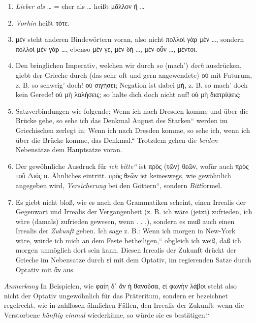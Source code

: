 \begin{enumerate}[leftmargin=0pt,rightmargin=0pt,listparindent =1cm,labelindent=1cm,labelsep=1ex,labelwidth={*},itemindent={*},align=left]
{μάρκας ἔχω παρὰ τοῦ πατρός.}
\item \emph{Lieber als} \ldots{} = eher als \ldots{} heißt \textgreek[variant=ancient]{μᾶλλον
ἢ }\ldots{}
\item \emph{Vorhin} heißt \textgreek[variant=ancient]{τότε.} 
\item \textgreek[variant=ancient]{μέν} steht anderen Bindewörtern voran,
also nicht \textgreek[variant=ancient]{πολλοὶ γὰρ μὲν }\ldots{}\textgreek[variant=ancient]{,}
sondern \textgreek[variant=ancient]{πολλοὶ μὲν γὰρ }\ldots{}\textgreek[variant=ancient]{,}
ebenso \textgreek[variant=ancient]{μέν γε, μὲν δή }\ldots{}\textgreek[variant=ancient]{,
μὲν οὖν }\ldots{}\textgreek[variant=ancient]{, μέντοι.}
\item Den bringlichen Imperativ, welchen wir durch \emph{so} (mach') \emph{doch}
ausdrücken, giebt der Grieche durch (das sehr oft und gern angewendete)
\textgreek[variant=ancient]{οὐ} mit Futurum, z. B. so schweig' doch!
\textgreek[variant=ancient]{οὐ σιγήσει;} Negation ist dabei \textgreek[variant=ancient]{μή,}
z. B. so mach' doch kein Gerede! \textgreek[variant=ancient]{οὐ μὴ
λαλήσεις; }so halte dich doch nicht auf! \textgreek[variant=ancient]{οὐ
μὴ διατρίψεις;}
\item Satzverbindungen wie folgende: \quotedblbase Wenn ich nach Dresden
komme und über die Brücke gehe, so sehe ich das Denkmal August des
Starken`` werden im Griechischen zerlegt in: \quotedblbase Wenn
ich nach Dresden komme, so sehe ich, wenn ich über die Brücke komme,
das Denkmal.`` Trotzdem gehen die \emph{beiden} Nebensätze dem Hauptsatze
voran. 
\item Der gewöhnliche Ausdruck für \emph{\quotedblbase ich bitte``} ist
\textgreek[variant=ancient]{πρὸς (τῶν) θεῶν,} wofür auch \textgreek[variant=ancient]{πρὸς
τοῦ Διός} u. Ähnliches eintritt. \textgreek[variant=ancient]{πρὸς
θεῶν} ist keines\textcompwordmark{}wegs, wie gewöhnlich angegeben
wird, \emph{\quotedblbase Versicherung} bei den Göttern``, sondern
\emph{Bitt}formel.
\item Es giebt nicht bloß, wie es nach den Grammatiken scheint, einen Irrealis
der Gegenwart und Irrealis der Vergangenheit (z. B. ich wäre (jetzt)
zufrieden, ich wäre (damals) zufrieden gewesen, wenn . . .), sondern
es muß auch einen Irrealis der \emph{Zukunft} geben. Ich sage z. B.:
\quotedblbase Wenn ich morgen in New-York wäre, würde ich mich an
dem Feste betheiligen,`` obgleich ich weiß, daß ich morgen unmöglich
dort sein kann. Diesen Irrealis der Zukunft drückt der Grieche im
Nebensatze durch \textgreek[variant=ancient]{εἰ} mit dem Optativ,
im regierenden Satze durch Optativ mit \textgreek[variant=ancient]{ἄν}
aus. 
\end{enumerate}
\emph{Anmerkung} In Beispielen, wie \textgreek[variant=ancient]{φαίη
δ᾽ ἂν ἡ θανοῦσα, εἰ φωνὴν λάβοι} steht also nicht der Optativ ungewöhnlich
für das Präteritum, sondern er bezeichnet regelrecht, wie in zahllosen
ähnlichen Fällen, den Irrealis der Zukunft: \quotedblbase wenn die
Verstorbene \emph{künftig einmal} wiederkäme, so würde sie es bestätigen.`` 
